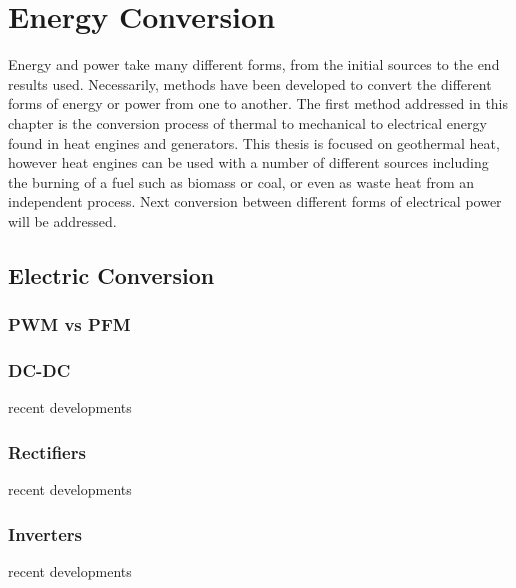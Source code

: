 \chapter{Energy Conversion}
\label{ch:conv}

Energy and power take many different forms, from the initial sources to the end results used. Necessarily, methods have been developed to convert the different forms of energy or power from one to another. The first method addressed in this chapter is the conversion process of thermal to mechanical to electrical energy found in heat engines and generators. This thesis is focused on geothermal heat, however heat engines can be used with a number of different sources including the burning of a fuel such as biomass or coal, or even as waste heat from an independent process. Next conversion between different forms of electrical power will be addressed.


\section{Electric Conversion}



\subsection{PWM vs PFM}

\subsection{DC-DC}
recent developments

\subsection{Rectifiers}
recent developments

\subsection{Inverters}
recent developments

